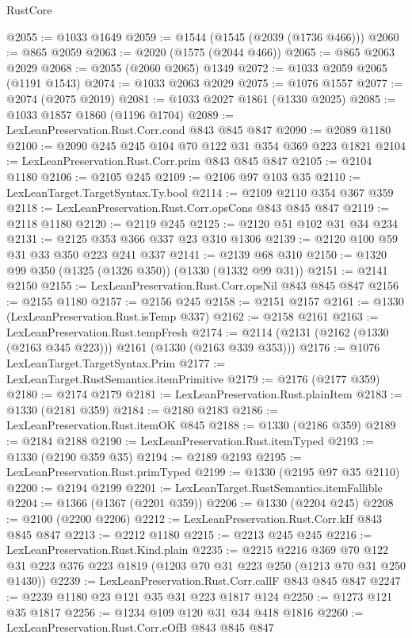 \begin{lexlean}{RustCore}
\begin{coremodule}
{\begin{coremodule}
{{{{{{{{@2055 := @1033 @1649
@2059 := @1544 (@1545 (@2039 (@1736 @466)))
@2060 := @865 @2059
@2063 := @2020 (@1575 (@2044 @466))
@2065 := @865 @2063 @2029
@2068 := @2055 (@2060 @2065) @1349
@2072 := @1033 @2059 @2065 (@1191 @1543)
@2074 := @1033 @2063 @2029
@2075 := @1076 @1557
@2077 := @2074 (@2075 @2019)
@2081 := @1033 @2027 @1861 (@1330 @2025)
@2085 := @1033 @1857 @1860 (@1196 @1704)
@2089 := LexLeanPreservation.Rust.Corr.cond @843 @845 @847
@2090 := @2089 @1180
@2100 := @2090 @245 @245 @104 @70 @122 @31 @354 @369 @223 @1821
@2104 := LexLeanPreservation.Rust.Corr.prim @843 @845 @847
@2105 := @2104 @1180
@2106 := @2105 @245
@2109 := @2106 @97 @103 @35
@2110 := LexLeanTarget.TargetSyntax.Ty.bool
@2114 := @2109 @2110 @354 @367 @359
@2118 := LexLeanPreservation.Rust.Corr.opsCons @843 @845 @847
@2119 := @2118 @1180
@2120 := @2119 @245
@2125 := @2120 @51 @102 @31 @34 @234
@2131 := @2125 @353 @366 @337 @23 @310 @1306
@2139 := @2120 @100 @59 @31 @33 @350 @223 @241 @337
@2141 := @2139 @68 @310
@2150 := @1320 @99 @350 (@1325 (@1326 @350)) (@1330 (@1332 @99 @31))
@2151 := @2141 @2150
@2155 := LexLeanPreservation.Rust.Corr.opsNil @843 @845 @847
@2156 := @2155 @1180
@2157 := @2156 @245
@2158 := @2151 @2157
@2161 := @1330 (LexLeanPreservation.Rust.isTemp @337)
@2162 := @2158 @2161
@2163 := LexLeanPreservation.Rust.tempFresh
@2174 := @2114 (@2131 (@2162 (@1330 (@2163 @345 @223))) @2161 (@1330 (@2163 @339 @353)))
@2176 := @1076 LexLeanTarget.TargetSyntax.Prim
@2177 := LexLeanTarget.RustSemantics.itemPrimitive
@2179 := @2176 (@2177 @359)
@2180 := @2174 @2179
@2181 := LexLeanPreservation.Rust.plainItem
@2183 := @1330 (@2181 @359)
@2184 := @2180 @2183
@2186 := LexLeanPreservation.Rust.itemOK @845
@2188 := @1330 (@2186 @359)
@2189 := @2184 @2188
@2190 := LexLeanPreservation.Rust.itemTyped
@2193 := @1330 (@2190 @359 @35)
@2194 := @2189 @2193
@2195 := LexLeanPreservation.Rust.primTyped
@2199 := @1330 (@2195 @97 @35 @2110)
@2200 := @2194 @2199
@2201 := LexLeanTarget.RustSemantics.itemFallible
@2204 := @1366 (@1367 (@2201 @359))
@2206 := @1330 (@2204 @245)
@2208 := @2100 (@2200 @2206)
@2212 := LexLeanPreservation.Rust.Corr.kIf @843 @845 @847
@2213 := @2212 @1180
@2215 := @2213 @245 @245
@2216 := LexLeanPreservation.Rust.Kind.plain
@2235 := @2215
    @2216
    @369
    @70
    @122
    @31
    @223
    @376
    @223
    @1819
    (@1203 @70 @31 @223 @250 (@1213 @70 @31 @250 @1430))
@2239 := LexLeanPreservation.Rust.Corr.callF @843 @845 @847
@2247 := @2239 @1180 @23 @121 @35 @31 @223 @1817 @124
@2250 := @1273 @121 @35 @1817
@2256 := @1234 @109 @120 @31 @34 @418 @1816
@2260 := LexLeanPreservation.Rust.Corr.eOfB @843 @845 @847
}}}}}}}}
\end{coremodule}}
\end{coremodule}
\end{lexlean}

